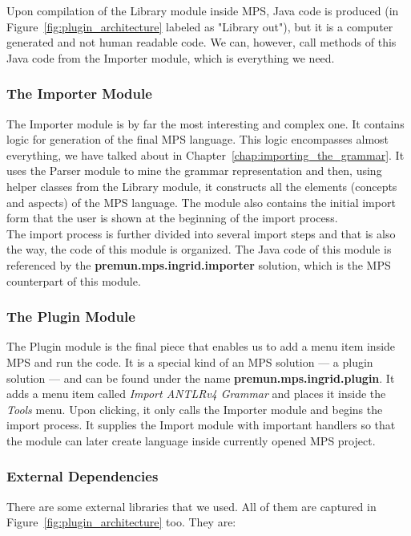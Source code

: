 Upon compilation of the Library module inside MPS, Java code is produced (in Figure~\ref{fig:plugin_architecture} labeled as "Library out"), but it is a computer generated and not human readable code.
We can, however, call methods of this Java code from the Importer module, which is everything we need.

\subsubsection{The Importer Module}

The Importer module is by far the most interesting and complex one.
It contains logic for generation of the final MPS language.
This logic encompasses almost everything, we have talked about in Chapter~\ref{chap:importing_the_grammar}.
It uses the Parser module to mine the grammar representation and then, using helper classes from the Library module, it constructs all the elements (concepts and aspects) of the MPS language.
The module also contains the initial import form that the user is shown at the beginning of the import process.
\\

The import process is further divided into several import steps and that is also the way, the code of this module is organized.
The Java code of this module is referenced by the \textbf{premun.mps.ingrid.importer} solution, which is the MPS counterpart of this module.

\subsubsection{The Plugin Module}

The Plugin module is the final piece that enables us to add a menu item inside MPS and run the code.
It is a special kind of an MPS solution --- a plugin solution --- and can be found under the name \textbf{premun.mps.ingrid.plugin}.
It adds a menu item called \textit{Import ANTLRv4 Grammar} and places it inside the \textit{Tools} menu.
Upon clicking, it only calls the Importer module and begins the import process.
It supplies the Import module with important handlers so that the module can later create language inside currently opened MPS project.

\subsubsection{External Dependencies}

There are some external libraries that we used.
All of them are captured in Figure~\ref{fig:plugin_architecture} too.
They are:


